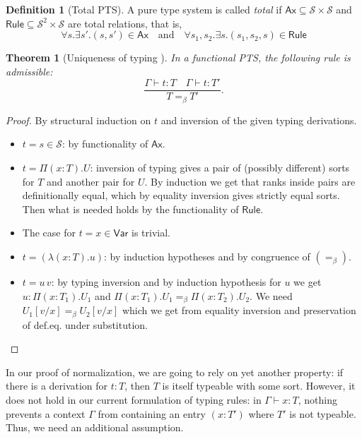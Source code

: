 \documentclass{article}
\newtheorem{theorem}{Theorem}
\theoremstyle{definition}
\newtheorem{definition}{Definition}
\theoremstyle{remark}
\begin{document}
\begin{definition}[Total PTS]
    A pure type system is called \emph{total} if
    $\mathsf{Ax}\subseteq\mathcal{S}\times\mathcal{S}$
    and $\mathsf{Rule}\subseteq\mathcal{S}^2\times
    \mathcal{S}$ are total relations, that is,
    \[
        \forall s.\exists s'.(s,s')\in\mathsf{Ax}
        \quad\text{and}\quad
        \forall s_1,s_2.\exists s.(s_1,s_2,s)\in
        \mathsf{Rule}
    \]
\end{definition}

\begin{theorem}[Uniqueness of typing ]
    In a functional PTS, the following rule is
    admissible:
    \[\dfrac{\Gamma\vdash t:T \quad \Gamma\vdash t:T'}
        {T =_\beta T'}.\]
\end{theorem}
\begin{proof}
    By structural induction on $t$ and
    inversion of the given typing derivations.
    \begin{itemize}
    \item $t=s\in\mathcal{S}$: by functionality of
        $\mathsf{Ax}$.
    \item $t=\Pi(x:T).U$: inversion of typing gives a
        pair of (possibly different) sorts for $T$ and
        another pair for $U$. By induction we get that
        ranks inside pairs are definitionally equal,
        which by equality inversion gives strictly
        equal sorts. Then what is needed holds by the
        functionality of $\mathsf{Rule}$.
    \item The case for $t=x\in\mathsf{Var}$ is trivial.
    \item $t=(\lambda(x:T).u)$: by induction hypotheses
        and by congruence of $(=_\beta)$.
    \item $t=u\,v$: by typing inversion and by
        induction hypothesis for $u$ we get $u:
        \Pi(x:T_1).U_1$ and $\Pi(x:T_1).U_1=_\beta
        \Pi(x:T_2).U_2$. We need $U_1[v/x]=_\beta
        U_2[v/x]$ which we get from equality inversion
        and preservation of def.eq. under substitution.
    \end{itemize}
\end{proof}

In our proof of normalization, we are going to rely on
yet another property: if there is a derivation for
$t:T$, then $T$ is itself typeable with some sort.
However, it does not hold in our current formulation of
typing rules: in $\Gamma\vdash x:T$, nothing prevents a
context $\Gamma$ from containing an entry $(x:T')$
where $T'$ is not typeable. Thus, we need an additional
assumption.
\end{document}
